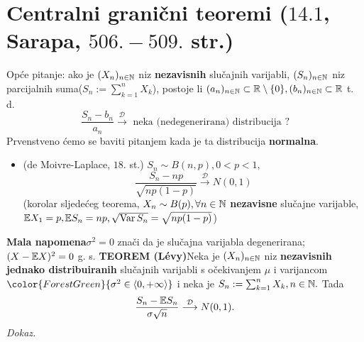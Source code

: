 \documentclass{article}
\newcommand{\Var}{\operatorname{Var}}
\begin{document}
\section{Centralni granični teoremi (\textsection \(14.1\), Sarapa, \(506.-509.\) str.)}
Opće pitanje: ako je \((X_n)_{n\in\Bbb N}\) niz \textbf{nezavisnih} slučajnih varijabli, \((S_n)_{n\in\Bbb N}\) niz parcijalnih suma\newline (\(\displaystyle S_n:=\sum_{k=1}^nX_k\)), postoje li \((a_n)_{n\in\Bbb N}\subset\Bbb R\setminus\{0\},(b_n)_{n\in\Bbb N}\subset\Bbb R\) t. d. \[\frac{S_n-b_n}{a_n}\overset{\mathcal D}{\longrightarrow}\text{ neka (nedegenerirana) distribucija ?}\]
Prvenstveno ćemo se baviti pitanjem kada je ta distribucija \textbf{normalna}. 
\begin{itemize}
    \item[\ding{113}] (de Moivre-Laplace, \(18.\) st.) \(S_n\sim B(n,p),0<p<1,\) \[\frac{S_n-np}{\sqrt{np(1-p)}}\overset{\mathcal D}{\longrightarrow}N(0,1)\] (korolar sljedećeg teorema, \(X_n\sim B(p),\forall n\in\Bbb N\) \textbf{nezavisne} slučajne varijable, \(\Bbb EX_1=p,\)\newline\(\Bbb ES_n=np,\sqrt{\Var S_n}=\sqrt{np(1-p)}\)) 
\end{itemize}
\textbf{Mala napomena}\newline \(\sigma^2=0\) znači da je slučajna varijabla degenerirana; \((X-\Bbb EX)^2=0\) g. s.\newline\newline
\textbf{TEOREM (L\'evy)}\newline Neka je \((X_n)_{n\in\Bbb N}\) niz \textbf{nezavisnih jednako distribuiranih} slučajnih varijabli s očekivanjem \(\mu\) i varijancom \(\color{ForestGreen}{\sigma^2\in\langle 0,+\infty\rangle}\) i neka je \(S_n:=\sum_{k=1}^nX_k,n\in\Bbb N.\) Tada \[\frac{S_n-\Bbb ES_n}{\sigma\sqrt n}\overset{\mathcal D}{\longrightarrow}N(0,1).\]
\textit{Dokaz.}\newline
\end{document}
